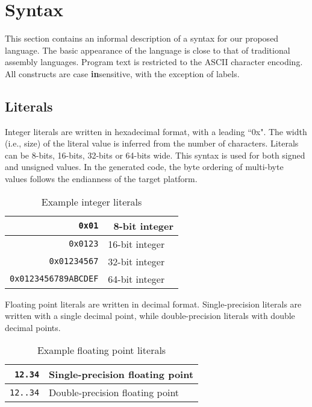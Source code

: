 \section{Syntax}

This section contains an informal description
of a syntax for our proposed language.
The basic appearance of the language is close
to that of traditional assembly languages.
Program text is restricted to the ASCII
character encoding. All constructs are case \textbf{in}sensitive,
with the exception of labels.

\subsection{Literals}

Integer literals are written in hexadecimal format, with a leading
``0x". The width (i.e., size) of the literal value is
inferred from the number of characters. Literals can be 8-bits, 16-bits,
32-bits or 64-bits wide. This syntax is used for both signed and unsigned values.
In the generated code, the byte ordering of multi-byte values follows the endianness
of the target platform.

\begin{table}[h!]
  \begin{center}
    \begin{tabular}{|r|l|}
      \hline
      \texttt{0x01}               & \ 8-bit integer  \\ \hline
      \texttt{0x0123}             &   16-bit integer \\ \hline
      \texttt{0x01234567}         &   32-bit integer \\ \hline
      \texttt{0x0123456789ABCDEF} &   64-bit integer \\ \hline
    \end{tabular}
  \end{center}
  \caption{Example integer literals}
\end{table}

Floating point literals are written in decimal format. Single-precision literals
are written with a single decimal point, while double-precision
literals with double decimal points.

\begin{table}[h!]
  \begin{center}
    \begin{tabular}{|r|l|}
      \hline
      \texttt{12.34}  & Single-precision floating point \\ \hline
      \texttt{12..34} & Double-precision floating point \\ \hline
    \end{tabular}
  \end{center}
  \caption{Example floating point literals}
\end{table}

